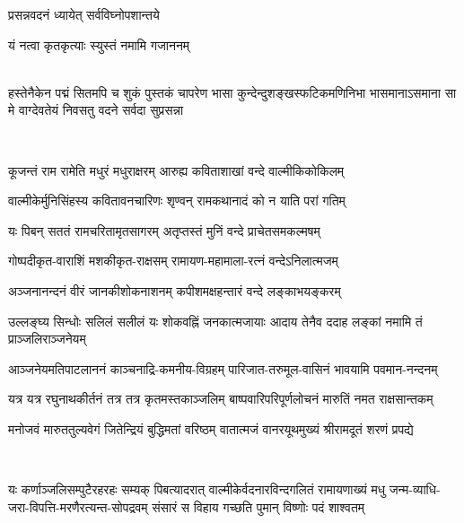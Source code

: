 

{प्रसन्नवदनं ध्यायेत् सर्वविघ्नोपशान्तये}

{यं नत्वा कृतकृत्याः स्युस्तं नमामि गजाननम्}

\mbox{}\\
{हस्तेनैकेन पद्मं सितमपि च शुकं पुस्तकं चापरेण}
{भासा कुन्देन्दुशङ्खस्फटिकमणिनिभा भासमानाऽसमाना}
{सा मे वाग्देवतेयं निवसतु वदने सर्वदा सुप्रसन्ना}

\mbox{}\\

\twolineshloka
{कूजन्तं राम रामेति मधुरं मधुराक्षरम्}
{आरुह्य कविताशाखां वन्दे वाल्मीकिकोकिलम्}

\twolineshloka
{वाल्मीकेर्मुनिसिंहस्य कवितावनचारिणः}
{शृण्वन् रामकथानादं को न याति परां गतिम्}

\twolineshloka
{यः पिबन् सततं रामचरितामृतसागरम्}
{अतृप्तस्तं मुनिं वन्दे प्राचेतसमकल्मषम्}

\begin{minipage}{\linewidth}
\centering
\resetShloka
{}

\twolineshloka
{गोष्पदीकृत-वाराशिं मशकीकृत-राक्षसम्}
{रामायण-महामाला-रत्नं वन्देऽनिलात्मजम्}
\end{minipage}

\twolineshloka
{अञ्जनानन्दनं वीरं जानकीशोकनाशनम्}
{कपीशमक्षहन्तारं वन्दे लङ्काभयङ्करम्}

\twolineshloka
{उल्लङ्घ्य सिन्धोः सलिलं सलीलं यः शोकवह्निं जनकात्मजायाः}
{आदाय तेनैव ददाह लङ्कां नमामि तं प्राञ्जलिराञ्जनेयम्}

\twolineshloka
{आञ्जनेयमतिपाटलाननं काञ्चनाद्रि-कमनीय-विग्रहम्}
{पारिजात-तरुमूल-वासिनं भावयामि पवमान-नन्दनम्}

\twolineshloka
{यत्र यत्र रघुनाथकीर्तनं तत्र तत्र कृतमस्तकाञ्जलिम्}
{बाष्पवारिपरिपूर्णलोचनं मारुतिं नमत राक्षसान्तकम्}

\twolineshloka
{मनोजवं मारुततुल्यवेगं जितेन्द्रियं बुद्धिमतां वरिष्ठम्}
{वातात्मजं वानरयूथमुख्यं श्रीरामदूतं शरणं प्रपद्ये}

\mbox{}\\
\resetShloka
{}

\fourlineindentedshloka
{यः कर्णाञ्जलिसम्पुटैरहरहः सम्यक् पिबत्यादरात्}
{वाल्मीकेर्वदनारविन्दगलितं रामायणाख्यं मधु}
{जन्म-व्याधि-जरा-विपत्ति-मरणैरत्यन्त-सोपद्रवम्}
{संसारं स विहाय गच्छति पुमान् विष्णोः पदं शाश्वतम्}

